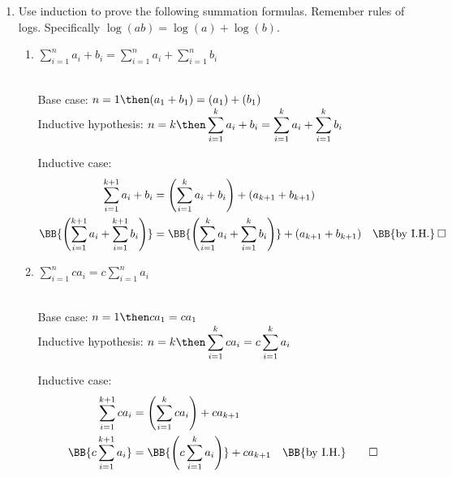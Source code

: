 \documentclass[basic, header]{nosvagor-notes}
\begin{document}
\begin{enumerate}[itemsep=4em]

  \item Use induction to prove the following summation formulas. Remember rules
    of logs. Specifically \(\log(ab) = \log(a) + \log(b)\).
    \begin{enumerate}[leftmargin=2em, itemsep=8em]
      \item \(\displaystyle \sum_{i=1}^{n} a_i + b_i = \sum_{i=1}^{n} a_i + \sum_{i=1}^{n} b_i  \)

        \\
        Base case: \(n = 1 \then
        (a_1 + b_1) = (a_1) + (b_1)\) \\
        Inductive hypothesis: \(\displaystyle
        n = k \then
        \sum_{i=1}^{k} a_i + b_i = \sum_{i=1}^{k} a_i + \sum_{i=1}^{k} b_i
        \)

        Inductive case:
        \begin{align*}
          \sum_{i=1}^{k+1} a_i + b_i
          &= \left(\sum_{i=1}^{k} a_i + b_i\right) + (a_{k+1} + b_{k+1}) \\
          \BB{\left(\sum_{i=1}^{k+1} a_i + \sum_{i=1}^{k+1} b_i\right)}
          &= \BB{\left(\sum_{i=1}^{k} a_i + \sum_{i=1}^{k} b_i\right)} + (a_{k+1} + b_{k+1})
          \quad  \text{\BB{by I.H.}} \hspace{-1.8em}\qed
        \end{align*}

      \item \(\displaystyle \sum_{i=1}^{n}ca_i = c \sum_{i=1}^{n} a_i \)

        \\
        Base case: \(n = 1 \then ca_1 = ca_1\)\\
        Inductive hypothesis: \(\displaystyle n = k
        \then
        \sum_{i=1}^{k} ca_i = c \sum_{i=1}^{k} a_i\)

        Inductive case:
        \begin{align*}
          \sum_{i=1}^{k+1} ca_i
           &= \left( \sum_{i=1}^{k} ca_i \right) + ca_{k+1}\\
           \BB{c \sum_{i=1}^{k+1} a_i}
           &= \BB{\left(c \sum_{i=1}^{k} a_i\right)} + ca_{k+1}
           & \text{\BB{by I.H.}} \qed \\
        \end{align*}

  \newpage %


\end{enumerate}
\end{enumerate}
\end{document}
